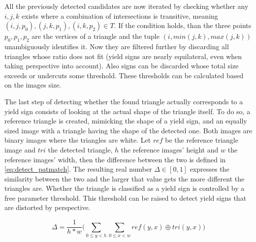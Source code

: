 \documentclass{report}
\begin{document}
All the previously detected candidates are now iterated by checking
whether any \( i, j, k \) exists where a combination of intersections
is transitive, meaning \( (i, j, p_0), (j, k, p_1), (i, k, p_2) \in T
\). If the condition holds, than the three points \( p_0, p_1, p_2 \)
are the vertices of a triangle and the tuple \( (i, min(j,k),
max(j,k)) \) unambiguously identifies it. Now they are filtered
further by discarding all triangles whose ratio does not fit (yield
signs are nearly equilateral, even when taking perspective into
account). Also signs can be discarded whose total size exceeds or
undercuts some threshold. These thresholds can be calculated based on
the images size.

The last step of detecting whether the found triangle actually
corresponds to a yield sign consists of looking at the actual shape of
the triangle itself. To do so, a reference triangle is created,
mimicking the shape of a yield sign, and an equally sized image with a
triangle having the shape of the detected one. Both images are binary
images where the triangles are white. Let \( ref \) be the reference
triangle image and \( tri \) the detected triangle, \( h \) the
reference images' height and \( w \) the reference images' width, then
the difference between the two is defined in
\ref{eq:detect_patmatch}. The resulting real number \( \Delta \in [0,
  1] \) expresses the similarity between the two and the larger that
value gets the more different the triangles are. Whether the triangle
is classified as a yield sign is controlled by a free parameter
threshold. This threshold can be raised to detect yield signs that are
distorted by perspective.

\begin{equation}\label{eq:detect_patmatch}
  \Delta = \frac{1}{h * w} \Bigg( \sum_{0 \leq y < h}\sum_{0 \leq x <w} ref(y, x) \oplus tri(y, x) \Bigg)
\end{equation}
\end{document}
